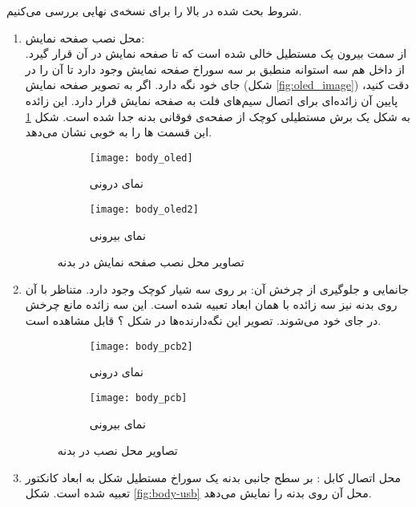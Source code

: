شروط بحث شده در بالا را برای نسخه‌ی نهایی بررسی می‌کنیم.
\begin{enumerate}
	\item محل نصب صفحه نمایش:\\
	از سمت بیرون یک مستطیل خالی شده است که تا صفحه نمایش در آن قرار گیرد. از داخل هم سه استوانه منطبق بر سه سوراخ صفحه نمایش وجود دارد تا آن را در جای خود نگه دارد. اگر به تصویر صفحه نمایش (شکل \ref{fig:oled_image}) دقت کنید، پایین آن زائده‌ای برای اتصال سیم‌های فلت به صفحه نمایش قرار دارد. این زائده به شکل یک برش مستطیلی کوچک از صفحه‌ی فوقانی بدنه جدا شده است. شکل \ref{fig:body-oled} این قسمت ها را به خوبی نشان می‌دهد.
	
	\begin{figure}[h]
		\centering
		\begin{subfigure}{0.4\textwidth}
			\centering
			\texttt{[image: body\_oled]}
			\caption{نمای درونی}
		\end{subfigure}
		\begin{subfigure}{0.45\textwidth}
			\centering
			\texttt{[image: body\_oled2]}
			\caption{نمای بیرونی}
		\end{subfigure}
		\caption{تصاویر محل نصب صفحه نمایش در بدنه}
		\label{fig:body-oled}
	\end{figure}
	
	\item  جانمایی \pcbf و جلوگیری از چرخش آن:
	بر روی \pcbf سه شیار کوچک وجود دارد. متناظر با آن روی بدنه نیز سه زائده با همان ابعاد تعبیه شده است. این سه زائده مانع چرخش \pcbf در جای خود می‌شوند. تصویر این نگه‌دارنده‌ها در شکل ؟ قابل مشاهده است.
	
	\begin{figure}[h]
		\centering
		\begin{subfigure}{0.4\textwidth}
			\centering
			\texttt{[image: body\_pcb2]}
			\caption{نمای درونی}
		\end{subfigure}
		\begin{subfigure}{0.45\textwidth}
			\centering
			\texttt{[image: body\_pcb]}
			\caption{نمای بیرونی}
		\end{subfigure}
		\caption{تصاویر محل نصب \pcbf در بدنه}
		\label{fig:body-pcb}
	\end{figure}
	
	\item محل اتصال کابل :
	بر سطح جانبی بدنه یک سوراخ مستطیل شکل به ابعاد کانکتور  تعبیه شده است. شکل \ref{fig:body-usb} محل آن روی بدنه را نمایش می‌دهد.


\end{enumerate}
